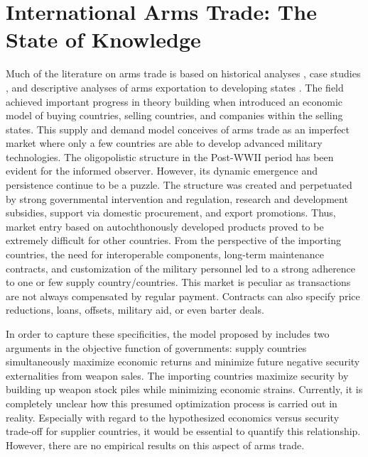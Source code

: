 \documentclass[12pt, letterpaper]{article}
\numberwithin{equation}{section}
\begin{document}
    
    

\section{International Arms Trade: The State of Knowledge} 


Much of the literature on arms trade is based on historical analyses \citep{Hark:75, Krau:92}, case studies  \citep{Kolo1987, Gill1992}, and descriptive analyses of arms exportation to developing states \citep{Leisetal:70,  BrzoOhls:87}. 
The field achieved important progress in theory building when \cite{Levietal:94} introduced an economic model of buying countries, selling countries, and companies within the selling states. This supply and demand model conceives of arms trade as an imperfect market where only a few countries are able to develop advanced military technologies. The oligopolistic structure in the Post-WWII period has been evident for the informed observer. However, its dynamic emergence and persistence continue to be a puzzle. The structure was created and perpetuated by strong governmental intervention and regulation, research and development subsidies, support via domestic procurement, and export promotions. Thus, market entry based on autochthonously developed products proved to be extremely difficult for other countries. From the perspective of the importing countries, the need for interoperable components, long-term maintenance contracts, and customization of the military personnel led to a strong adherence to one or few supply country/countries. This market is peculiar as transactions are not always compensated by regular payment. Contracts can also specify price reductions, loans, offsets, military aid, or even barter deals.  

In order to capture these specificities, the model proposed by \citet{Levietal:94} includes two arguments in the objective function of governments: supply countries simultaneously maximize economic returns and minimize future negative security externalities from weapon sales. The importing countries maximize security by building up weapon stock piles while minimizing economic strains. Currently, it is completely unclear how this presumed optimization process is carried out in reality. Especially with regard to the hypothesized economics versus security trade-off for supplier countries, it would be essential to quantify this relationship. However, there are no empirical results on this aspect of arms trade. 
\end{document}
